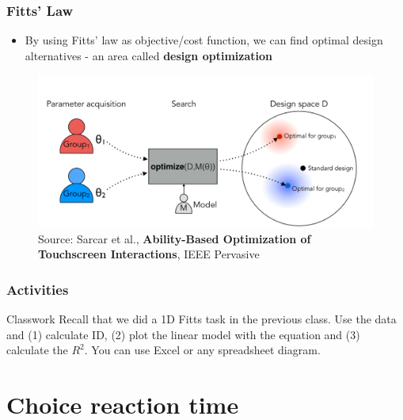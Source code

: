 \documentclass{beamer}
\begin{document}
\begin{frame}
	\frametitle{Fitts' Law}
	\begin{itemize}
		\item By using Fitts' law as objective/cost function, we can find optimal design alternatives - an area called \textbf{design optimization}
	\end{itemize}
	\centering
	\begin{figure}
		\includegraphics[width=.9\linewidth]{image/optimization}
		\caption{Source: Sarcar et al., \textbf{Ability-Based Optimization of Touchscreen Interactions}, IEEE Pervasive}
	\end{figure}
\end{frame}

\begin{frame}
	\frametitle{Activities}
	\begin{block}{Classwork}
		Recall that we did a 1D Fitts task in the previous class.   Use the data and (1) calculate ID, (2) plot the linear model with the equation and (3) calculate the $R^2$. You can use Excel or any spreadsheet diagram. 
	\end{block}
\end{frame}

\section{Choice reaction time}
\end{document}
